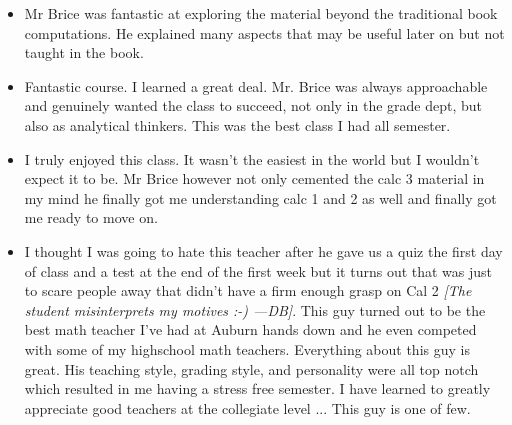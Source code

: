 \documentclass[11pt]{article}
\begin{document}
	\begin{itemize}
	
		\item{}
      Mr Brice was fantastic at exploring the material beyond the
      traditional book computations.
      He explained many aspects that may be useful later on but not
      taught in the book.
		
		\item{}
      Fantastic course.
      I learned a great deal.
      Mr. Brice was always approachable and genuinely wanted the class
      to succeed, not only in the grade dept, but also as analytical
      thinkers.
      This was the best class I had all semester.
	
		\item{}
      I truly enjoyed this class.
      It wasn't the easiest in the world but I wouldn't expect it to be.
      Mr Brice however not only cemented the calc 3 material in my mind
      he finally got me understanding calc 1 and 2 as well and finally
      got me ready to move on.
		
		\item{}
      I thought I was going to hate this teacher after he gave us a quiz
      the first day of class and a test at the end of the first week but
      it turns out that was just to scare people away that didn't have a
      firm enough grasp on Cal 2
      \emph{[The student misinterprets my motives :-) ---DB]}.
      This guy turned out to be the best math teacher I've had at Auburn
      hands down and he even competed with some of my highschool math
      teachers.
      Everything about this guy is great.
      His teaching style, grading style, and personality were all top
      notch which resulted in me having a stress free semester.
      I have learned to greatly appreciate good teachers at the
      collegiate level ...
  		This guy is one of few.
	\end{itemize}
\end{document}
